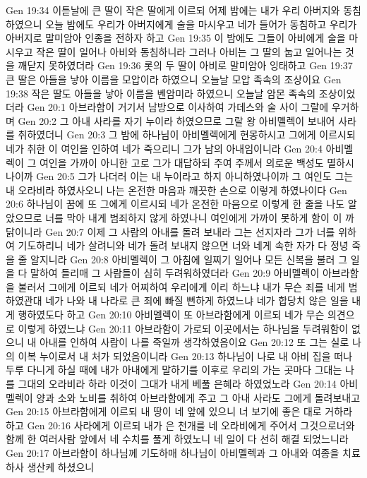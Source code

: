Gen 19:34  이튿날에 큰 딸이 작은 딸에게 이르되 어제 밤에는 내가 우리 아버지와 동침하였으니 오늘 밤에도 우리가 아버지에게 술을 마시우고 네가 들어가 동침하고 우리가 아버지로 말미암아 인종을 전하자 하고
Gen 19:35  이 밤에도 그들이 아비에게 술을 마시우고 작은 딸이 일어나 아비와 동침하니라 그러나 아비는 그 딸의 눕고 일어나는 것을 깨닫지 못하였더라
Gen 19:36  롯의 두 딸이 아비로 말미암아 잉태하고
Gen 19:37  큰 딸은 아들을 낳아 이름을 모압이라 하였으니 오늘날 모압 족속의 조상이요
Gen 19:38  작은 딸도 아들을 낳아 이름을 벤암미라 하였으니 오늘날 암몬 족속의 조상이었더라
Gen 20:1  아브라함이 거기서 남방으로 이사하여 가데스와 술 사이 그랄에 우거하며
Gen 20:2  그 아내 사라를 자기 누이라 하였으므로 그랄 왕 아비멜렉이 보내어 사라를 취하였더니
Gen 20:3  그 밤에 하나님이 아비멜렉에게 현몽하시고 그에게 이르시되 네가 취한 이 여인을 인하여 네가 죽으리니 그가 남의 아내임이니라
Gen 20:4  아비멜렉이 그 여인을 가까이 아니한 고로 그가 대답하되 주여 주께서 의로운 백성도 멸하시나이까
Gen 20:5  그가 나더러 이는 내 누이라고 하지 아니하였나이까 그 여인도 그는 내 오라비라 하였사오니 나는 온전한 마음과 깨끗한 손으로 이렇게 하였나이다
Gen 20:6  하나님이 꿈에 또 그에게 이르시되 네가 온전한 마음으로 이렇게 한 줄을 나도 알았으므로 너를 막아 내게 범죄하지 않게 하였나니 여인에게 가까이 못하게 함이 이 까닭이니라
Gen 20:7  이제 그 사람의 아내를 돌려 보내라 그는 선지자라 그가 너를 위하여 기도하리니 네가 살려니와 네가 돌려 보내지 않으면 너와 네게 속한 자가 다 정녕 죽을 줄 알지니라
Gen 20:8  아비멜렉이 그 아침에 일찌기 일어나 모든 신복을 불러 그 일을 다 말하여 들리매 그 사람들이 심히 두려워하였더라
Gen 20:9  아비멜렉이 아브라함을 불러서 그에게 이르되 네가 어찌하여 우리에게 이리 하느냐 내가 무슨 죄를 네게 범하였관대 네가 나와 내 나라로 큰 죄에 빠질 뻔하게 하였느냐 네가 합당치 않은 일을 내게 행하였도다 하고
Gen 20:10  아비멜렉이 또 아브라함에게 이르되 네가 무슨 의견으로 이렇게 하였느냐
Gen 20:11  아브라함이 가로되 이곳에서는 하나님을 두려워함이 없으니 내 아내를 인하여 사람이 나를 죽일까 생각하였음이요
Gen 20:12  또 그는 실로 나의 이복 누이로서 내 처가 되었음이니라
Gen 20:13  하나님이 나로 내 아비 집을 떠나 두루 다니게 하실 때에 내가 아내에게 말하기를 이후로 우리의 가는 곳마다 그대는 나를 그대의 오라비라 하라 이것이 그대가 내게 베풀 은혜라 하였었노라
Gen 20:14  아비멜렉이 양과 소와 노비를 취하여 아브라함에게 주고 그 아내 사라도 그에게 돌려보내고
Gen 20:15  아브라함에게 이르되 내 땅이 네 앞에 있으니 너 보기에 좋은 대로 거하라 하고
Gen 20:16  사라에게 이르되 내가 은 천개를 네 오라비에게 주어서 그것으로너와 함께 한 여러사람 앞에서 네 수치를 풀게 하였노니 네 일이 다 선히 해결 되었느니라
Gen 20:17  아브라함이 하나님께 기도하매 하나님이 아비멜렉과 그 아내와 여종을 치료하사 생산케 하셨으니
